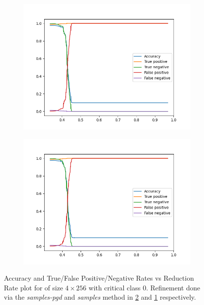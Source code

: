 \begin{figure}
    \begin{subfigure}{0.475\linewidth}
        \includegraphics[scale=0.275]{figs/mnist-compr-4-256-samples.png}
        \caption{}
        \label{f:mnist-compr-samples}
    \end{subfigure}
    \begin{subfigure}{0.475\linewidth}
        \includegraphics[scale=0.275]{figs/mnist-compr-4-256-pgd-after-samples.png}
        \caption{}
        \label{f:mnist-compr-samples-pgd}
    \end{subfigure}
    \caption{Accuracy and True/False Positive/Negative Rates vs Reduction Rate
        plot for \mnist of size $4 \times 256$ with critical class 0. Refinement
    done via the \textit{samples-pgd} and \textit{samples} method in
    \ref{f:mnist-compr-samples-pgd} and \ref{f:mnist-compr-samples}
    respectively. }
    \label{f:mnist-class}
\end{figure}

